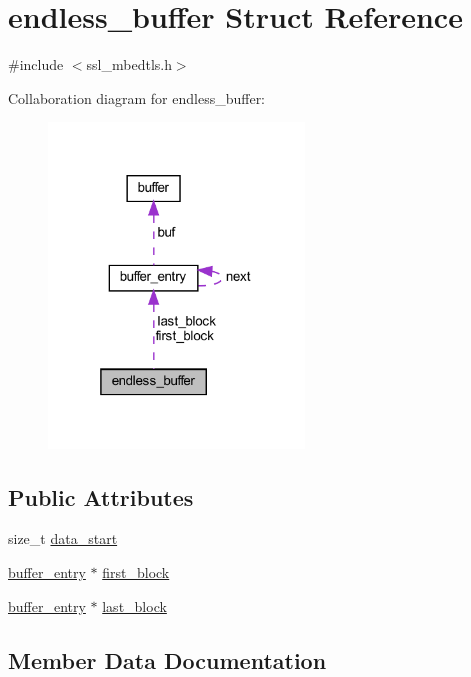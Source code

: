 \hypertarget{structendless__buffer}{}\section{endless\+\_\+buffer Struct Reference}
\label{structendless__buffer}


{\ttfamily \#include $<$ssl\+\_\+mbedtls.\+h$>$}



Collaboration diagram for endless\+\_\+buffer\+:
\nopagebreak
\begin{figure}[H]
\begin{center}
\leavevmode
\includegraphics[width=193pt]{structendless__buffer__coll__graph}
\end{center}
\end{figure}
\subsection*{Public Attributes}
\begin{DoxyCompactItemize}
\item 
size\+\_\+t \hyperlink{structendless__buffer_a54a1e7a82ef3247b40f91e041ca80ba1}{data\+\_\+start}
\item 
\hyperlink{structbuffer__entry}{buffer\+\_\+entry} $\ast$ \hyperlink{structendless__buffer_a67832b7fe99230c26191497d63057c19}{first\+\_\+block}
\item 
\hyperlink{structbuffer__entry}{buffer\+\_\+entry} $\ast$ \hyperlink{structendless__buffer_a9bd4f8a71a81da83cf655f6c3ce30f51}{last\+\_\+block}
\end{DoxyCompactItemize}


\subsection{Member Data Documentation}
\hypertarget{structendless__buffer_a54a1e7a82ef3247b40f91e041ca80ba1}{}
